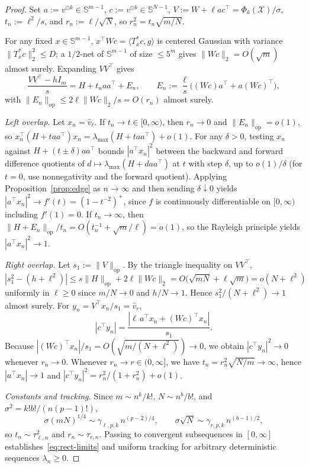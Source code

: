 \documentclass[11pt]{article}
\theoremstyle{plain}
\theoremstyle{definition}
\theoremstyle{remark}
\begin{document}
\begin{proof}
Set $a := v^{\odot k} \in \mathbb{S}^{m-1}$, $c := v^{\odot b} \in \mathbb{S}^{N-1}$, $V := W + \ell a c^\top = \Phi_k(\mathcal{X})/\sigma$, $t_n := \ell^2 / s$, and $r_n := \ell / \sqrt{N}$, so $r_n^2 = t_n \sqrt{m/N}$.

For any fixed $x \in \mathbb{S}^{m-1}$, $x^\top W c = \langle T_x^* c, g \rangle$ is centered Gaussian with variance $\|T_x^* c\|_2^2 \le D$; a $1/2$-net of $\mathbb{S}^{m-1}$ of size $\le 5^m$ gives $\|W c\|_2 = O(\sqrt{m})$ almost surely. Expanding $VV^\top$ gives
\[
\frac{V V^\top - h I_m}{s} = H + t_n a a^\top + E_n,
\qquad
E_n := \frac{\ell}{s}\bigl((Wc)a^\top + a(Wc)^\top\bigr),
\]
with $\|E_n\|_{\mathrm{op}} \le 2\ell \|Wc\|_2 / s = O(r_n)$ almost surely.

\emph{Left overlap.} Let $x_n = \hat v_\ell$. If $t_n \to t \in [0, \infty)$, then $r_n \to 0$ and $\|E_n\|_{\mathrm{op}} = o(1)$, so $x_n^\top(H + taa^\top)x_n = \lambda_{\max}(H + taa^\top) + o(1)$. For any $\delta > 0$, testing $x_n$ against $H + (t \pm \delta)aa^\top$ bounds $|a^\top x_n|^2$ between the backward and forward difference quotients of $d \mapsto \lambda_{\max}(H + daa^\top)$ at $t$ with step $\delta$, up to $o(1)/\delta$ (for $t = 0$, use nonnegativity and the forward quotient). Applying Proposition~\ref{prop:edge} as $n \to \infty$ and then sending $\delta \downarrow 0$ yields $|a^\top x_n|^2 \to f'(t) = (1 - t^{-2})^+$, since $f$ is continuously differentiable on $[0, \infty)$ including $f'(1) = 0$. If $t_n \to \infty$, then $\|H + E_n\|_{\mathrm{op}} / t_n = O(t_n^{-1} + \sqrt{m}/\ell) = o(1)$, so the Rayleigh principle yields $|a^\top x_n|^2 \to 1$.

\emph{Right overlap.} Let $s_1 := \|V\|_{\mathrm{op}}$. By the triangle inequality on $VV^\top$,
\[
|s_1^2 - (h + \ell^2)| \le s\|H\|_{\mathrm{op}} + 2\ell \|Wc\|_2 = O\bigl(\sqrt{mN} + \ell\sqrt{m}\bigr) = o(N + \ell^2)
\]
uniformly in $\ell \ge 0$ since $m/N \to 0$ and $h/N \to 1$. Hence $s_1^2 / (N + \ell^2) \to 1$ almost surely. For $y_n = V^\top x_n / s_1 = \hat v_r$,
\[
|c^\top y_n| = \frac{|\ell\,a^\top x_n + (Wc)^\top x_n|}{s_1}.
\]
Because $|(Wc)^\top x_n| / s_1 = O(\sqrt{m/(N+\ell^2)}) \to 0$, we obtain $|c^\top y_n|^2 \to 0$ whenever $r_n \to 0$. Whenever $r_n \to r \in (0, \infty]$, we have $t_n = r_n^2 \sqrt{N/m} \to \infty$, hence $|a^\top x_n| \to 1$ and $|c^\top y_n|^2 = r_n^2 / (1 + r_n^2) + o(1)$.

\emph{Constants and tracking.} Since $m \sim n^k / k!$, $N \sim n^b / b!$, and $\sigma^2 = k!b!/(n(p-1)!)$,
\[
\sigma (mN)^{1/4} \sim \gamma_{\ell,p,k}\, n^{(p-2)/4}, \qquad
\sigma \sqrt{N} \sim \gamma_{r,p,k}\, n^{(b-1)/2},
\]
so $t_n \sim \tau_{\ell,n}^2$ and $r_n \sim \tau_{r,n}$. Passing to convergent subsequences in $[0, \infty]$ establishes~\eqref{eq:rect-limits} and uniform tracking for arbitrary deterministic sequences $\lambda_n \ge 0$.
\end{proof}
\end{document}
